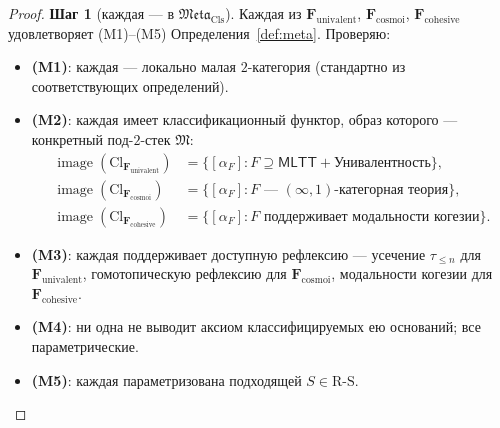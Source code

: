 \documentclass[11pt]{article}
\theoremstyle{plain}
\theoremstyle{definition}
\newcommand{\RS}{\mathrm{R\text{-}S}}
\newcommand{\fM}{\mathfrak{M}}
\newcommand{\Meta}{\mathfrak{Meta}}
\newcommand{\Cl}{\mathrm{Cl}}
\newcommand{\MLTT}{\mathsf{MLTT}}
\DeclareMathOperator{\image}{image}
\begin{document}
\begin{proof}

\textbf{Шаг 1} (каждая — в $\Meta_{\mathrm{Cls}}$). Каждая из $\mathbf{F}_{\mathrm{univalent}}$, $\mathbf{F}_{\mathrm{cosmoi}}$, $\mathbf{F}_{\mathrm{cohesive}}$ удовлетворяет (M1)--(M5) Определения~\ref{def:meta}. Проверяю:
\begin{itemize}
\item \textbf{(M1)}: каждая — локально малая $2$-категория (стандартно из соответствующих определений).
\item \textbf{(M2)}: каждая имеет классификационный функтор, образ которого — конкретный под-$2$-стек $\fM$:
\begin{align*}
\image(\Cl_{\mathbf{F}_{\mathrm{univalent}}}) &= \{[\alpha_F] : F \supseteq \MLTT + \text{Унивалентность}\}, \\
\image(\Cl_{\mathbf{F}_{\mathrm{cosmoi}}}) &= \{[\alpha_F] : F \text{ — } (\infty, 1)\text{-категорная теория}\}, \\
\image(\Cl_{\mathbf{F}_{\mathrm{cohesive}}}) &= \{[\alpha_F] : F \text{ поддерживает модальности когезии}\}.
\end{align*}
\item \textbf{(M3)}: каждая поддерживает доступную рефлексию --- усечение $\tau_{\leq n}$ для $\mathbf{F}_{\mathrm{univalent}}$, гомотопическую рефлексию для $\mathbf{F}_{\mathrm{cosmoi}}$, модальности когезии для $\mathbf{F}_{\mathrm{cohesive}}$.
\item \textbf{(M4)}: ни одна не выводит аксиом классифицируемых ею оснований; все параметрические.
\item \textbf{(M5)}: каждая параметризована подходящей $S \in \RS$.
\end{itemize}


\end{proof}
\end{document}
